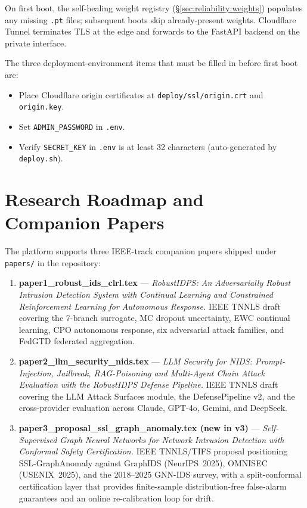 \documentclass[11pt,a4paper]{article}
\begin{document}
On first boot, the self-healing weight registry
(\S\ref{sec:reliability:weights}) populates any missing \texttt{.pt}
files; subsequent boots skip already-present weights.  Cloudflare
Tunnel terminates TLS at the edge and forwards to the FastAPI
backend on the private interface.

The three deployment-environment items that must be filled in before
first boot are:
\begin{itemize}[nosep]
  \item Place Cloudflare origin certificates at
        \texttt{deploy/ssl/origin.crt} and \texttt{origin.key}.
  \item Set \texttt{ADMIN\_PASSWORD} in \texttt{.env}.
  \item Verify \texttt{SECRET\_KEY} in \texttt{.env} is at least
        32 characters (auto-generated by \texttt{deploy.sh}).
\end{itemize}

\section{Research Roadmap and Companion Papers}
\label{sec:research_roadmap}

The platform supports three IEEE-track companion papers shipped under
\texttt{papers/} in the repository:

\begin{enumerate}[leftmargin=*]
  \item \textbf{paper1\_robust\_ids\_clrl.tex} --- \emph{RobustIDPS:
        An Adversarially Robust Intrusion Detection System with
        Continual Learning and Constrained Reinforcement Learning
        for Autonomous Response.}  IEEE TNNLS draft covering the
        7-branch surrogate, MC dropout uncertainty, EWC continual
        learning, CPO autonomous response, six adversarial attack
        families, and FedGTD federated aggregation.
  \item \textbf{paper2\_llm\_security\_nids.tex} --- \emph{LLM
        Security for NIDS: Prompt-Injection, Jailbreak, RAG-Poisoning
        and Multi-Agent Chain Attack Evaluation with the RobustIDPS
        Defense Pipeline.}  IEEE TNNLS draft covering the LLM Attack
        Surfaces module, the DefensePipeline v2, and the cross-provider
        evaluation across Claude, GPT-4o, Gemini, and DeepSeek.
  \item \textbf{paper3\_proposal\_ssl\_graph\_anomaly.tex (new in v3)}
        --- \emph{Self-Supervised Graph Neural Networks for Network
        Intrusion Detection with Conformal Safety Certification.}
        IEEE TNNLS/TIFS proposal positioning SSL-GraphAnomaly
        against GraphIDS (NeurIPS~2025), OMNISEC (USENIX~2025), and
        the 2018--2025 GNN-IDS survey, with a split-conformal
        certification layer that provides finite-sample
        distribution-free false-alarm guarantees and an online
        re-calibration loop for drift.
\end{enumerate}
\end{document}
